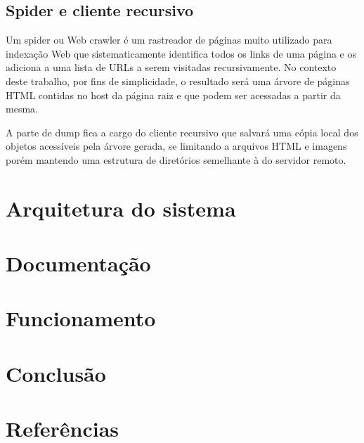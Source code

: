 \documentclass[a4paper, 12pt]{article}
\begin{document}
\subsection{Spider e cliente recursivo}
Um spider ou Web crawler é um rastreador de páginas muito utilizado para indexação Web que sistematicamente identifica todos os links de uma página e os adiciona a uma lista de URLs a serem visitadas recursivamente. No contexto deste trabalho, por fins de simplicidade, o resultado será uma árvore de páginas HTML contidas no host da página raiz e que podem ser acessadas a partir da mesma.

A parte de dump fica a cargo do cliente recursivo que salvará uma cópia local dos objetos acessíveis pela árvore gerada, se limitando a arquivos HTML e imagens porém mantendo uma estrutura de diretórios semelhante à do servidor remoto.
\section{Arquitetura do sistema}
\section{Documentação}
\section{Funcionamento}
\section{Conclusão}
\section{Referências}

\noindent
\end{document}
